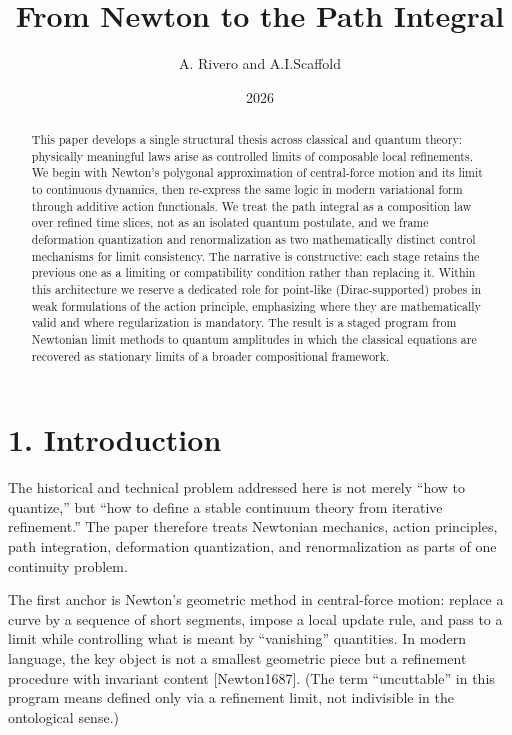 \documentclass[
]{article}
\title{From Newton to the Path Integral}
\author{A. Rivero and A.I.Scaffold}
\date{2026}
\begin{document}
\maketitle
\begin{abstract}
This paper develops a single structural thesis across classical and
quantum theory: physically meaningful laws arise as controlled limits of
composable local refinements. We begin with Newton's polygonal
approximation of central-force motion and its limit to continuous
dynamics, then re-express the same logic in modern variational form
through additive action functionals. We treat the path integral as a
composition law over refined time slices, not as an isolated quantum
postulate, and we frame deformation quantization and renormalization as
two mathematically distinct control mechanisms for limit consistency.
The narrative is constructive: each stage retains the previous one as a
limiting or compatibility condition rather than replacing it. Within
this architecture we reserve a dedicated role for point-like
(Dirac-supported) probes in weak formulations of the action principle,
emphasizing where they are mathematically valid and where regularization
is mandatory. The result is a staged program from Newtonian limit
methods to quantum amplitudes in which the classical equations are
recovered as stationary limits of a broader compositional framework.
\end{abstract}

\section{1. Introduction}\label{introduction}

The historical and technical problem addressed here is not merely ``how
to quantize,'' but ``how to define a stable continuum theory from
iterative refinement.'' The paper therefore treats Newtonian mechanics,
action principles, path integration, deformation quantization, and
renormalization as parts of one continuity problem.

The first anchor is Newton's geometric method in central-force motion:
replace a curve by a sequence of short segments, impose a local update
rule, and pass to a limit while controlling what is meant by
``vanishing'' quantities. In modern language, the key object is not a
smallest geometric piece but a refinement procedure with invariant
content {[}Newton1687{]}. (The term ``uncuttable'' in this program means
defined only via a refinement limit, not indivisible in the ontological
sense.)
\end{document}
